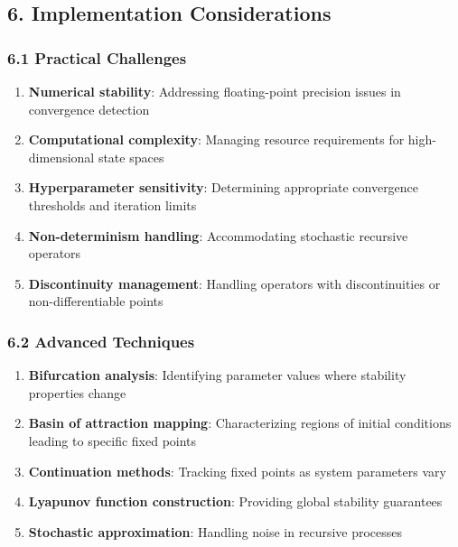 \documentclass[
]{article}
\providecommand{\tightlist}{%
  \setlength{\itemsep}{0pt}\setlength{\parskip}{0pt}}
\begin{document}
\subsection{6. Implementation
Considerations}\label{implementation-considerations}

\subsubsection{6.1 Practical Challenges}\label{practical-challenges}

\begin{enumerate}
\def\labelenumi{\arabic{enumi}.}
\tightlist
\item
  \textbf{Numerical stability}: Addressing floating-point precision
  issues in convergence detection
\item
  \textbf{Computational complexity}: Managing resource requirements for
  high-dimensional state spaces
\item
  \textbf{Hyperparameter sensitivity}: Determining appropriate
  convergence thresholds and iteration limits
\item
  \textbf{Non-determinism handling}: Accommodating stochastic recursive
  operators
\item
  \textbf{Discontinuity management}: Handling operators with
  discontinuities or non-differentiable points
\end{enumerate}

\subsubsection{6.2 Advanced Techniques}\label{advanced-techniques}

\begin{enumerate}
\def\labelenumi{\arabic{enumi}.}
\tightlist
\item
  \textbf{Bifurcation analysis}: Identifying parameter values where
  stability properties change
\item
  \textbf{Basin of attraction mapping}: Characterizing regions of
  initial conditions leading to specific fixed points
\item
  \textbf{Continuation methods}: Tracking fixed points as system
  parameters vary
\item
  \textbf{Lyapunov function construction}: Providing global stability
  guarantees
\item
  \textbf{Stochastic approximation}: Handling noise in recursive
  processes
\end{enumerate}
\end{document}
